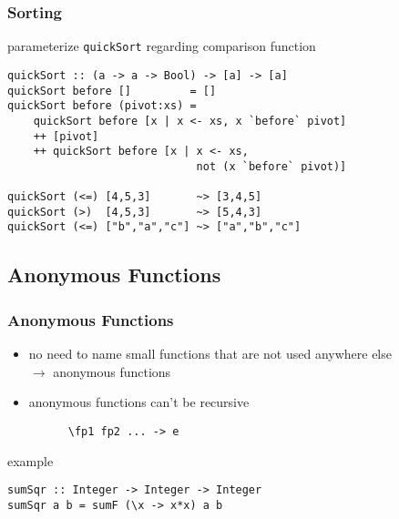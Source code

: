 \documentclass[dvipsnames]{beamer}
\theoremstyle{plain}
\begin{document}
\begin{frame}[fragile]
  \frametitle{Sorting}

  \begin{exampleblock}{parameterize \lstinline{quickSort} regarding comparison
      function}
    \begin{lstlisting}
quickSort :: (a -> a -> Bool) -> [a] -> [a]
quickSort before []         = []
quickSort before (pivot:xs) =
    quickSort before [x | x <- xs, x `before` pivot]
    ++ [pivot]
    ++ quickSort before [x | x <- xs,
                             not (x `before` pivot)]

quickSort (<=) [4,5,3]       ~> [3,4,5]
quickSort (>)  [4,5,3]       ~> [5,4,3]
quickSort (<=) ["b","a","c"] ~> ["a","b","c"]
    \end{lstlisting}
  \end{exampleblock}
\end{frame}

\subsection{Anonymous Functions}

\begin{frame}[fragile]
  \frametitle{Anonymous Functions}

  \begin{itemize}
    \item no need to name small functions that are not used anywhere else\\
      $\rightarrow$ \alert{anonymous functions}
    \item anonymous functions can't be recursive
    \begin{lstlisting}
      \fp1 fp2 ... -> e
    \end{lstlisting}
  \end{itemize}

  \pause
  \medskip
  \begin{exampleblock}{example}
    \begin{lstlisting}
sumSqr :: Integer -> Integer -> Integer
sumSqr a b = sumF (\x -> x*x) a b
    \end{lstlisting}
  \end{exampleblock}
\end{frame}
\end{document}
